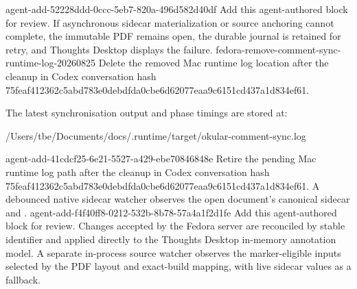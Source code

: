 \agentProposedEdit
  {agent-add-52228ddd-0ccc-5eb7-820a-496d582d40df}
  {Add this agent-authored block for review.}
  {}
  {If asynchronous sidecar materialization or source anchoring cannot complete, the immutable PDF remains open, the durable journal is retained for retry, and Thoughts Desktop displays the failure.}
\agentProposedEdit
  {fedora-remove-comment-sync-runtime-log-20260825}
  {Delete the removed Mac runtime log location after the cleanup in Codex conversation hash 75feaf412362c5abd783e0debdfda0cbe6d62077eaa9c6151cd437a1d834ef61.}
  {The latest synchronisation output and phase timings are stored at:
\begin{DocCode}
/Users/tbe/Documents/docs/.runtime/target/okular-comment-sync.log
\end{DocCode}}
  {}
\agentProposedEdit
  {agent-add-41cdcf25-6e21-5527-a429-ebe70846848e}
  {Retire the pending Mac runtime log path after the cleanup in Codex conversation hash 75feaf412362c5abd783e0debdfda0cbe6d62077eaa9c6151cd437a1d834ef61.}
  {}
  {}
A debounced native sidecar watcher observes the open document's canonical sidecar and .
\agentProposedEdit
  {agent-add-f4f40ff8-0212-532b-8b78-57a4a1f2d1fe}
  {Add this agent-authored block for review.}
  {}
  {Changes accepted by the Fedora server are reconciled by stable identifier and applied directly to the Thoughts Desktop in-memory annotation model.}
A separate in-process source watcher observes the marker-eligible  inputs selected by the PDF layout and exact-build mapping, with live sidecar  values as a fallback.
